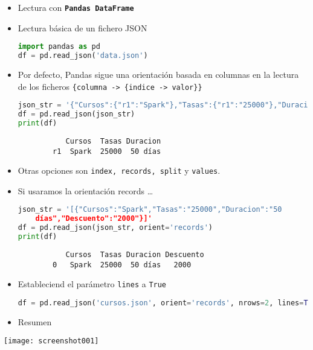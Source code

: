 \begin{itemize}[label=\color{red}\textbullet, leftmargin=*]
	\item \color{lightblue}Lectura con \textbf{\texttt{Pandas DataFrame}}
\end{itemize}
\begin{itemize}
	\item Lectura básica de un fichero JSON
	\begin{lstlisting}[language=python]
import pandas as pd
df = pd.read_json('data.json')
	\end{lstlisting}
	\item Por defecto, Pandas sigue una orientación basada en columnas en la lectura de los ficheros \texttt{\{columna -> \{indice -> valor\}\}}
\begin{lstlisting}[language=python]
json_str = '{"Cursos":{"r1":"Spark"},"Tasas":{"r1":"25000"},"Duracion":{"r1":"50 días"}}'
df = pd.read_json(json_str)
print(df)
\end{lstlisting}
\begin{center}
	\begin{verbatim}
		   Cursos  Tasas Duracion
		r1  Spark  25000  50 días
	\end{verbatim}
\end{center}
\item Otras opciones son \texttt{index, records, split} y \texttt{values}.
\item Si usaramos la orientación records \dots
\begin{lstlisting}[language=python]
json_str = '[{"Cursos":"Spark","Tasas":"25000","Duracion":"50
	días","Descuento":"2000"}]'
df = pd.read_json(json_str, orient='records')
print(df)
\end{lstlisting}
\begin{center}
	\begin{verbatim}
		   Cursos  Tasas Duracion Descuento
		0   Spark  25000  50 días   2000
	\end{verbatim}
\end{center}
\item Estableciend el parámetro \texttt{lines} a \texttt{True}
\begin{lstlisting}[language=python]
df = pd.read_json('cursos.json', orient='records', nrows=2, lines=True)
\end{lstlisting}
\end{itemize}
\begin{itemize}[label=\color{red}\textbullet, leftmargin=*]
	\item \color{lightblue}Resumen
\end{itemize}
\begin{center}
	\texttt{[image: screenshot001]}
\end{center}

